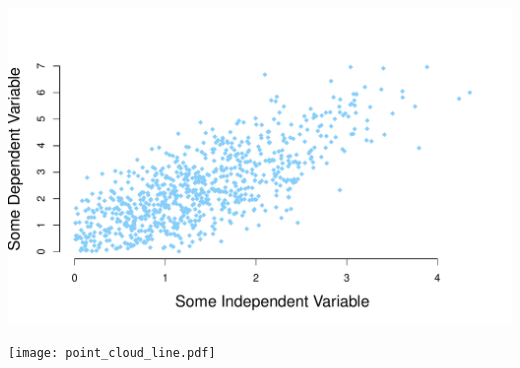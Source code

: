 \documentclass[aspectratio=169]{beamer}
\theoremstyle{principle}
\begin{document}
\begin{frame}

\begin{center}
\includegraphics[scale=0.6]{point_cloud.pdf}
\end{center}

\end{frame}

\begin{frame}

\begin{center}
\texttt{[image: point\_cloud\_line.pdf]}
\end{center}

\end{frame}
\end{document}
